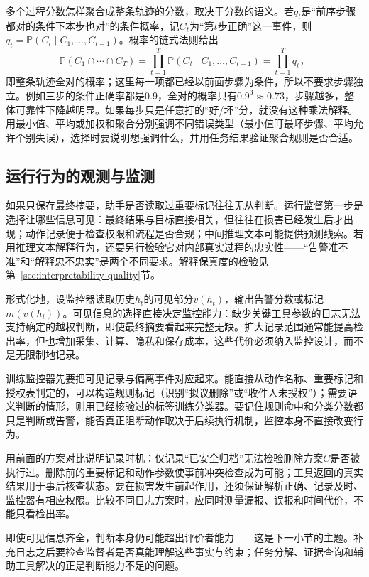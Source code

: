 多个过程分数怎样聚合成整条轨迹的分数，取决于分数的语义。若$q_t$是“前序步骤都对的条件下本步也对”的条件概率，记$C_t$为“第$t$步正确”这一事件，则$q_t=\mathbb P(C_t\mid C_1,\ldots,C_{t-1})$。概率的链式法则给出
\[
 \mathbb P(C_1\cap\cdots\cap C_T)=\prod_{t=1}^{T}\mathbb P(C_t\mid C_1,\ldots,C_{t-1})=\prod_{t=1}^{T}q_t\text{，}
\]
即整条轨迹全对的概率；这里每一项都已经以前面步骤为条件，所以不要求步骤独立。例如三步的条件正确率都是0.9，全对的概率只有$0.9^3\approx0.73$，步骤越多，整体可靠性下降越明显。如果每步只是任意打的“好/坏”分，就没有这种乘法解释。用最小值、平均或加权和聚合分别强调不同错误类型（最小值盯最坏步骤、平均允许个别失误），选择时要说明想强调什么，并用任务结果验证聚合规则是否合适。

\subsection{运行行为的观测与监测}
\label{sec:alignment-oversight-information}

如果只保存最终摘要，助手是否读取过重要标记往往无从判断。运行监督第一步是选择让哪些信息可见：最终结果与目标直接相关，但往往在损害已经发生后才出现；动作记录便于检查权限和流程是否合规；中间推理文本可能提供预测线索。若用推理文本解释行为，还要另行检验它对内部真实过程的忠实性——“告警准不准”和“解释忠不忠实”是两个不同要求。解释保真度的检验见第~\ref{sec:interpretability-quality}节。

形式化地，设监控器读取历史$h_t$的可见部分$v(h_t)$，输出告警分数或标记$m(v(h_t))$。可见信息的选择直接决定监控能力：缺少关键工具参数的日志无法支持确定的越权判断，即使最终摘要看起来完整无缺。扩大记录范围通常能提高检出率，但也增加采集、计算、隐私和保存成本，这些代价必须纳入监控设计，而不是无限制地记录。

训练监控器先要把可见记录与偏离事件对应起来。能直接从动作名称、重要标记和授权表判定的，可以构造规则标记（识别“拟议删除”或“收件人未授权”）；需要语义判断的情形，则用已经核验过的标签训练分类器。要记住规则命中和分类分数都只是判断或告警，能否真正阻断动作取决于后续执行机制，监控本身不直接改变行为。

用前面的方案对比说明记录时机：仅记录“已安全归档”无法检验删除方案$C$是否被执行过。删除前的重要标记和动作参数使事前冲突检查成为可能；工具返回的真实结果用于事后核查状态。要在损害发生前起作用，还须保证解析正确、记录及时、监控器有相应权限。比较不同日志方案时，应同时测量漏报、误报和时间代价，不能只看检出率。

即使可见信息齐全，判断本身仍可能超出评价者能力——这是下一小节的主题。补充日志之后要检查监督者是否真能理解这些事实与约束；任务分解、证据查询和辅助工具解决的正是判断能力不足的问题。

